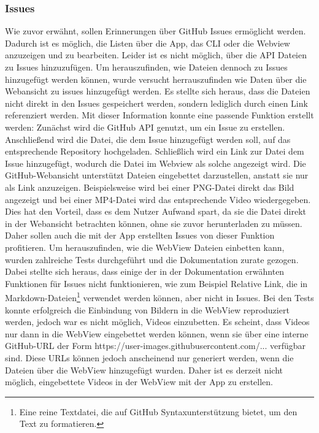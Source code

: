 \subsubsection{Issues}%
Wie zuvor erwähnt, sollen Erinnerungen über GitHub Issues ermöglicht werden. Dadurch ist es möglich, die Listen über die App, das CLI oder die Webview anzuzeigen und zu bearbeiten.%
Leider ist es nicht möglich, über die API Dateien zu Issues hinzuzufügen\cite{imp_github_issueFilesUnsupported}. %
	Um herauszufinden, wie Dateien dennoch zu Issues hinzugefügt werden können, wurde versucht herrauszufinden wie Daten über die Webansicht zu issues hinzugefügt werden. Es stellte sich heraus, dass die Dateien nicht direkt in den Issues gespeichert werden, sondern lediglich durch einen Link referenziert werden. %
	Mit dieser Information konnte eine passende Funktion erstellt werden: Zunächst wird die GitHub API genutzt, um ein Issue zu erstellen. Anschließend wird die Datei, die dem Issue hinzugefügt werden soll, auf das entsprechende Repository hochgeladen. Schließlich wird ein Link zur Datei dem Issue hinzugefügt, wodurch die Datei im Webview als solche angezeigt wird. %
\newline%
Die GitHub-Webansicht unterstützt Dateien eingebettet darzustellen, anstatt sie nur als Link anzuzeigen. Beispielsweise wird bei einer PNG-Datei direkt das Bild angezeigt und bei einer MP4-Datei wird das entsprechende Video wiedergegeben. %
Dies hat den Vorteil, dass es dem Nutzer Aufwand spart, da sie die Datei direkt in der Webansicht betrachten können, ohne sie zuvor herunterladen zu müssen.%
Daher sollen auch die mit der App erstellten Issues von dieser Funktion profitieren. Um herauszufinden, wie die WebView Dateien einbetten kann, wurden zahlreiche Tests durchgeführt und die Dokumentation zurate gezogen\cite{imp_github_syntaxing}. Dabei stellte sich heraus, dass einige der in der Dokumentation erwähnten Funktionen für Issues nicht funktionieren, wie zum Beispiel \glqq Relative Link\grqq{}, die in Markdown-Dateien\footnote{Eine reine Textdatei, die auf GitHub Syntaxunterstützung bietet, um den Text zu formatieren.} verwendet werden können, aber nicht in Issues.
Bei den Tests konnte erfolgreich die Einbindung von Bildern in die WebView reproduziert werden, jedoch war es nicht möglich, Videos einzubetten. Es scheint, dass Videos nur dann in die WebView eingebettet werden können, wenn sie über eine interne GitHub-URL der Form \glqq https://user-images.githubusercontent.com/...\grqq{} verfügbar sind. Diese URLs können jedoch anscheinend nur generiert werden, wenn die Dateien über die WebView hinzugefügt wurden. Daher ist es derzeit nicht möglich, eingebettete Videos in der WebView mit der App zu erstellen.%
